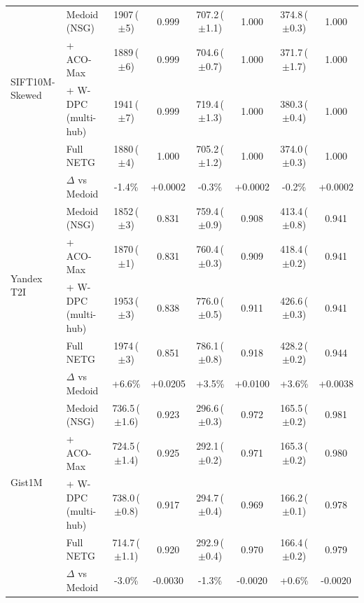 \begin{table}[t]
{\begin{tabular}{llcccccc}
\midrule
\multirow{4}{*}{SIFT10M-Skewed} & Medoid (NSG) & 1907\,{\scriptsize($\pm$5)} & 0.999 & 707.2\,{\scriptsize($\pm$1.1)} & 1.000 & 374.8\,{\scriptsize($\pm$0.3)} & 1.000 \\
 & + ACO-Max & 1889\,{\scriptsize($\pm$6)} & 0.999 & 704.6\,{\scriptsize($\pm$0.7)} & 1.000 & 371.7\,{\scriptsize($\pm$1.7)} & 1.000 \\
 & + W-DPC (multi-hub) & 1941\,{\scriptsize($\pm$7)} & 0.999 & 719.4\,{\scriptsize($\pm$1.3)} & 1.000 & 380.3\,{\scriptsize($\pm$0.4)} & 1.000 \\
 & Full NETG & 1880\,{\scriptsize($\pm$4)} & 1.000 & 705.2\,{\scriptsize($\pm$1.2)} & 1.000 & 374.0\,{\scriptsize($\pm$0.3)} & 1.000 \\
 & \quad$\Delta$ vs Medoid & -1.4\% & +0.0002 & -0.3\% & +0.0002 & -0.2\% & +0.0002 \\
\midrule
\multirow{4}{*}{Yandex T2I} & Medoid (NSG) & 1852\,{\scriptsize($\pm$3)} & 0.831 & 759.4\,{\scriptsize($\pm$0.9)} & 0.908 & 413.4\,{\scriptsize($\pm$0.8)} & 0.941 \\
 & + ACO-Max & 1870\,{\scriptsize($\pm$1)} & 0.831 & 760.4\,{\scriptsize($\pm$0.3)} & 0.909 & 418.4\,{\scriptsize($\pm$0.2)} & 0.941 \\
 & + W-DPC (multi-hub) & 1953\,{\scriptsize($\pm$3)} & 0.838 & 776.0\,{\scriptsize($\pm$0.5)} & 0.911 & 426.6\,{\scriptsize($\pm$0.3)} & 0.941 \\
 & Full NETG & 1974\,{\scriptsize($\pm$3)} & 0.851 & 786.1\,{\scriptsize($\pm$0.8)} & 0.918 & 428.2\,{\scriptsize($\pm$0.2)} & 0.944 \\
 & \quad$\Delta$ vs Medoid & +6.6\% & +0.0205 & +3.5\% & +0.0100 & +3.6\% & +0.0038 \\
\midrule
\multirow{4}{*}{Gist1M} & Medoid (NSG) & 736.5\,{\scriptsize($\pm$1.6)} & 0.923 & 296.6\,{\scriptsize($\pm$0.3)} & 0.972 & 165.5\,{\scriptsize($\pm$0.2)} & 0.981 \\
 & + ACO-Max & 724.5\,{\scriptsize($\pm$1.4)} & 0.925 & 292.1\,{\scriptsize($\pm$0.2)} & 0.971 & 165.3\,{\scriptsize($\pm$0.2)} & 0.980 \\
 & + W-DPC (multi-hub) & 738.0\,{\scriptsize($\pm$0.8)} & 0.917 & 294.7\,{\scriptsize($\pm$0.4)} & 0.969 & 166.2\,{\scriptsize($\pm$0.1)} & 0.978 \\
 & Full NETG & 714.7\,{\scriptsize($\pm$1.1)} & 0.920 & 292.9\,{\scriptsize($\pm$0.4)} & 0.970 & 166.4\,{\scriptsize($\pm$0.2)} & 0.979 \\
 & \quad$\Delta$ vs Medoid & -3.0\% & -0.0030 & -1.3\% & -0.0020 & +0.6\% & -0.0020 \\
\midrule
\bottomrule
\end{tabular}}
\end{table}
